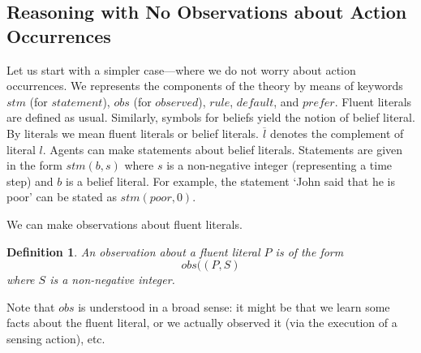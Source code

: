 \documentclass{article}
\newtheorem{definition}{Definition}
\def\naf{\: {not} \:}
\begin{document}
%
%


\subsection{Reasoning with No Observations about Action Occurrences}

Let us start with a simpler case---where we do not worry about action
occurrences. We represents the components of the theory by means of keywords 
$stm$ (for $statement$), $obs$ (for $observed$), $rule$, $default$, and $prefer$. 
Fluent literals are defined as usual. Similarly, symbols for beliefs yield the notion of belief literal. By literals we mean fluent literals or belief literals. $\overline{l}$ 
denotes the complement of literal $l$. Agents can make statements about belief literals.  
Statements are given in the form {$stm(b,s)$}
where  $s$ is a non-negative integer (representing a time step) and $b$ is a belief literal.  
For example, the statement `John said that he is poor'  can be stated as 
$stm(poor, 0)$. 

%


\iffalse
We can make observations about fluent literals. 
\begin{definition} 
An observation about a fluent literal $P$ is of the form 
\begin{equation}\label{obs}
obs((P,   S)  
\end{equation} 
where  $S$ is a non-negative integer. 
\end{definition} 
Note that $obs$ is understood in a broad sense: it might be that we learn some facts about the fluent literal, or we actually observed it (via the execution of a sensing action), etc. 
\end{document}
